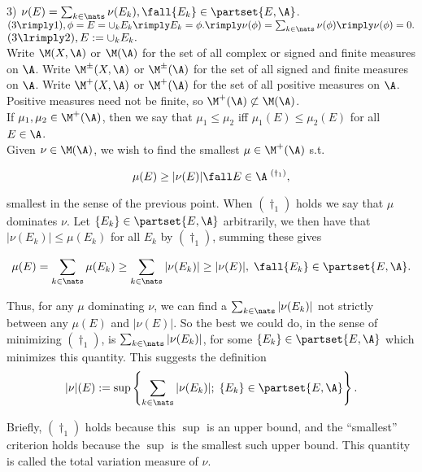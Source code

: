 3) $\nu(E) = \sum_{k \in \nats} \nu(E_k), \fall \{ E_k\} \in \partset{E, \A}$.\\

$(3 \rimply 1), \phi = E = \cup_k E_k \rimply E_k = \phi. \rimply \nu(\phi) = \sum_{k \in \nats } \nu(\phi) \rimply \nu(\phi) = 0.$ $(3 \lrimply 2), E := \cup_k E_k.$ \\



Write $\M(X,\A)$ or $\M(\A)$ for the set of all complex or signed and finite measures on $\A$.
Write $\M^\pm(X,\A)$ or $\M^\pm(\A)$ for the set of all signed and finite measures on $\A$.
Write $\M^+(X,\A)$ or $\M^+(\A)$ for the set of all positive measures on $\A$. 
Positive measures need not be finite, so $\M^+(\A) \not \subset \M(\A)$.
\\



If $\mu_1,\mu_2 \in \M^+(\A)$, then we say that $\mu_1 \le \mu_2$ iff $\mu_1(E) \le \mu_2(E)$ for all $E \in \A$.\\

Given $\nu \in \M(\A)$, we wish to find the smallest $\mu \in \M^+(\A)$ s.t.

$$
     \mu(E)  \ge |\nu(E)| \fall E \in \A  \; {}^{(\dagger_1)},
$$
 
\noindent
smallest in the sense of the previous point. When ${(\dagger_1)}$ holds we say that $\mu$ dominates $\nu$.  Let $\{ E_k \} \in \partset{E,\A}$ arbitrarily, we then have that $|\nu(E_k)| \le \mu(E_k)$ for all $E_k$ by ${(\dagger_1)}$, summing these gives 

$$
\mu(E) = \sum_{k \in \nats} \mu(E_k) \ge \sum_{k \in \nats} |\nu(E_k)| \ge | \nu(E)|, \; \fall \{ E_k\} \in \partset{E, \A}.
$$

\noindent
Thus, for any $\mu$ dominating $\nu$, we can find a $\sum_{k \in \nats} |\nu(E_k)|$ not strictly between any $\mu(E)$ and $|\nu(E)|$. So the best we could do, in the sense of minimizing ${(\dagger_1)}$, is $\sum_{k \in \nats} |\nu(E_k)|$, for some $ \{ E_k\} \in \partset{E, \A}$ which minimizes this quantity. This suggests the definition\\

$$
|\nu|(E) := \sup \left\{  \sum_{k \in \nats} |\nu(E_k)| ; \; \{ E_k\} \in \partset{E, \A}  \right\}.
$$

\noindent   
Briefly, ${(\dagger_1)}$ holds because this $\sup$ is an upper bound, and the ``smallest'' criterion holds because the $\sup$ is the smallest such upper bound. This quantity is called the total variation measure of $\nu$. \\






